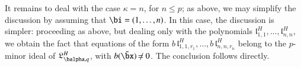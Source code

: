 \documentclass[amsthm]{elsart}
\begin{document}
It remains to deal with the case $\kappa=n$, for $n \le p$; as above,
we may simplify the discussion by assuming that $\bi=(1,\dots,n)$. In
this case, the discussion is simpler: proceeding as above, but dealing
only with the polynomials
$\mathfrak{l}^H_{1,1},\dots,\mathfrak{l}^H_{n,n}$, we obtain the fact
that equations of the form $b\, \mathfrak{l}^H_{1,1,r_1},\dots,b\,
\mathfrak{l}^H_{n,n,r_n}$ belong to the $p$-minor ideal of
$\mathfrak{L}^H_{\balpha,q}$, with $b(\tilde\bx) \ne 0$. The
conclusion follows directly.


 
\end{document}
